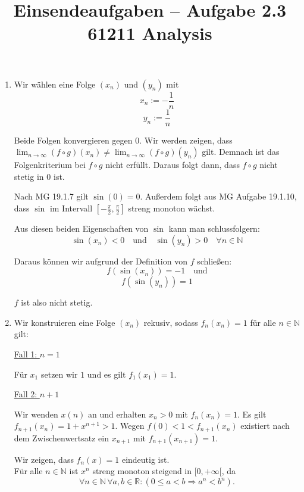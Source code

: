\documentclass[a4paper,12pt]{article}
\title{Einsendeaufgaben -- Aufgabe 2.3\\[0.5em]
\large 61211 Analysis}
\author{}
\date{}
\begin{document}
\maketitle

\begin{enumerate}[label=\alph*)]
    \item

          Wir wählen eine Folge $(x_n)$ und $(y_n)$ mit
          \[
              x_n := -\frac{1}{n}
          \]
          \[
              y_n := \frac{1}{n}
          \]

          Beide Folgen konvergieren gegen $0$. Wir werden zeigen, dass $\lim_{n\to\infty} (f \circ g)(x_n) \neq \lim_{n\to\infty} (f \circ g)(y_n)$ gilt. Demnach ist das Folgenkriterium bei $f \circ g$ nicht erfüllt. Daraus folgt dann, dass $f \circ g$ nicht stetig in $0$ ist.

          Nach MG 19.1.7 gilt $\sin(0) = 0$. Außerdem folgt aus MG Aufgabe 19.1.10, dass $\sin$ im Intervall $\left[-\frac{\pi}{2}, \frac{\pi}{2}\right]$ streng monoton wächst.

          Aus diesen beiden Eigenschaften von $\sin$ kann man schlussfolgern:
          \[
              \sin(x_n) < 0 \quad \text{und} \quad \sin(y_n) > 0 \quad \forall n \in \mathbb{N}
          \]

          Daraus können wir aufgrund der Definition von $f$ schließen:
          \[
              f(\sin(x_n)) = -1 \quad \text{und}
          \]
          \[
              f(\sin(y_n)) = 1
          \]

          $f$ ist also nicht stetig.

          \bigskip

    \item
          Wir konstruieren eine Folge $(x_n)$ rekusiv, sodass $f_n(x_n) = 1$ für alle $n \in \mathbb{N}$ gilt:

          \underline{Fall 1: $n = 1$}

          Für $x_1$ setzen wir $1$ und es gilt $f_1(x_1) = 1$.

          \underline{Fall 2: $n + 1$}

          Wir wenden $x(n)$ an und erhalten $x_n > 0$ mit $f_n(x_n) = 1$. Es gilt $f_{n+1}(x_n) = 1 + x^{n+1} > 1$. Wegen $f(0) < 1 < f_{n+1}(x_n)$ existiert nach dem Zwischenwertsatz ein $x_{n+1}$ mit $f_{n+1}(x_{n+1}) = 1$.

          \bigskip
         
          Wir zeigen, dass $f_n(x) = 1$ eindeutig ist.
          \\ Für alle $n \in \mathbb{N}$ ist $x^n$ streng monoton steigend in $[0, +\infty[$, da
          \[
              \forall n \in \mathbb{N} \, \forall a, b \in \mathbb{R} : (0 \leq a < b \Rightarrow a^{n} < b^{n}).
          \]


\end{enumerate}
\end{document}

